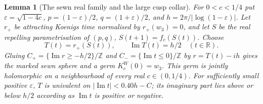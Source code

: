 \documentclass[11pt]{article}
\newtheorem{lemma}[theorem]{Lemma}
\newcommand{\im}{\operatorname{Im}}
\begin{document}
\begin{lemma}[The sewn real family and the large cusp collar]
\label{lem:sewn}
For $0<c<1/4$ put $\varepsilon=\sqrt{1-4c}$,
$p=(1-\varepsilon)/2$, $q=(1+\varepsilon)/2$, and
$h=2\pi/|\log(1-\varepsilon)|$.
Let $r_+$ be attracting Koenigs time normalised by $r_+(w_3)=0$,
and let $S$ be the real repelling parametrisation of $(p,q)$,
$S(t+1)=f_c(S(t))$. Choose
\[
 T(t)=r_+(S(t)),\qquad \im T(t)=h/2\quad(t\in\mathbb R).
\]
Gluing $C_+=\{\im r\ge-h/2\}/\mathbb Z$ and
$C_-=\{\im t\le0\}/\mathbb Z$ by $r=T(t)-ih$ gives the marked
sewn sphere and a germ $K_c^W(0)=w_3$. This germ is jointly
holomorphic on a neighbourhood of every real $c\in(0,1/4)$.
For sufficiently small positive $\varepsilon$, $T$ is univalent on
$|\im t|<0.40h-C$; its imaginary part lies above or below $h/2$
according as $\im t$ is positive or negative.
\end{lemma}
\end{document}
